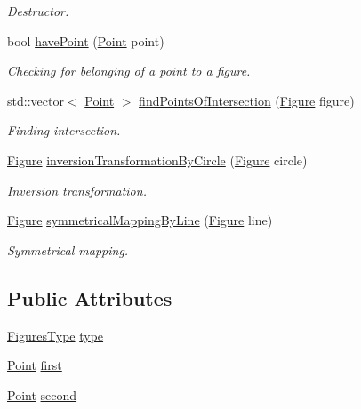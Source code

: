 \begin{DoxyCompactItemize}
\begin{DoxyCompactList}\small\item\em Destructor. \end{DoxyCompactList}\item 
bool \mbox{\hyperlink{classfop_1_1_figure_adaa195836173f677f9207c0b5f9c84fe}{have\+Point}} (\mbox{\hyperlink{structtdp_1_1_point}{Point}} point)
\begin{DoxyCompactList}\small\item\em Checking for belonging of a point to a figure. \end{DoxyCompactList}\item 
std\+::vector$<$ \mbox{\hyperlink{structtdp_1_1_point}{Point}} $>$ \mbox{\hyperlink{classfop_1_1_figure_a65bb58cd0c1cd84f8e8134d3118e760a}{find\+Points\+Of\+Intersection}} (\mbox{\hyperlink{classfop_1_1_figure}{Figure}} figure)
\begin{DoxyCompactList}\small\item\em Finding intersection. \end{DoxyCompactList}\item 
\mbox{\hyperlink{classfop_1_1_figure}{Figure}} \mbox{\hyperlink{classfop_1_1_figure_aae228e84324267f99ea7ece5067c94d9}{inversion\+Transformation\+By\+Circle}} (\mbox{\hyperlink{classfop_1_1_figure}{Figure}} circle)
\begin{DoxyCompactList}\small\item\em Inversion transformation. \end{DoxyCompactList}\item 
\mbox{\hyperlink{classfop_1_1_figure}{Figure}} \mbox{\hyperlink{classfop_1_1_figure_a7f1666507e49eb3c2a79dc33ae49eb90}{symmetrical\+Mapping\+By\+Line}} (\mbox{\hyperlink{classfop_1_1_figure}{Figure}} line)
\begin{DoxyCompactList}\small\item\em Symmetrical mapping. \end{DoxyCompactList}\end{DoxyCompactItemize}
\subsection*{Public Attributes}
\begin{DoxyCompactItemize}
\item 
\mbox{\hyperlink{namespacefop_a60dafe2e1ac5bb402dad57ecacde23d5}{Figures\+Type}} \mbox{\hyperlink{classfop_1_1_figure_ab3800215a1229d637bae3c24cfc59e08}{type}}
\item 
\mbox{\hyperlink{structtdp_1_1_point}{Point}} \mbox{\hyperlink{classfop_1_1_figure_afac8422d33b66489e3a7ddda4751d219}{first}}
\item 
\mbox{\hyperlink{structtdp_1_1_point}{Point}} \mbox{\hyperlink{classfop_1_1_figure_a10aa53d6dcfa427b06ebcf93ae6075b9}{second}}
\end{DoxyCompactItemize}
